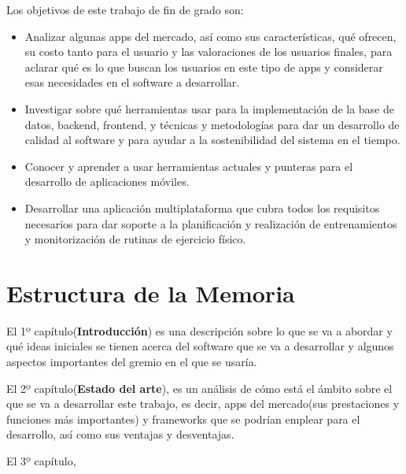 Los objetivos de este trabajo de fin de grado son:

\begin{itemize}
	\item Analizar algunas apps del mercado, así como sus características, qué ofrecen, su costo tanto para el usuario 
 y las valoraciones de los usuarios finales, para aclarar qué es lo que buscan los usuarios en este tipo de apps y considerar esas necesidades en el software a desarrollar.
	\item Investigar sobre qué herramientas usar para la implementación de la base de datos, backend, frontend, y técnicas y metodologías para dar un desarrollo de calidad al software y para ayudar a la sostenibilidad del sistema en el tiempo.
	\item Conocer y aprender a usar herramientas actuales y punteras para el desarrollo de aplicaciones móviles. 
	\item Desarrollar una aplicación multiplataforma que cubra todos los requisitos necesarios para dar soporte a la planificación y realización de entrenamientos y monitorización de rutinas de ejercicio físico. %
\end{itemize}

\section{Estructura de la Memoria}

El 1º capítulo(\textbf{Introducción}) es una descripción sobre lo que se va a abordar y qué ideas iniciales se tienen acerca del software que se va a desarrollar y algunos aspectos importantes del gremio en el que se usaría.

El 2º capítulo(\textbf{Estado del arte}), es un análisis de cómo está el ámbito sobre el que se va a desarrollar este trabajo, es decir, apps del mercado(sus prestaciones y funciones más importantes) y frameworks que se podrían emplear para el desarrollo, así como sus ventajas y desventajas.  %

El 3º capítulo, %
